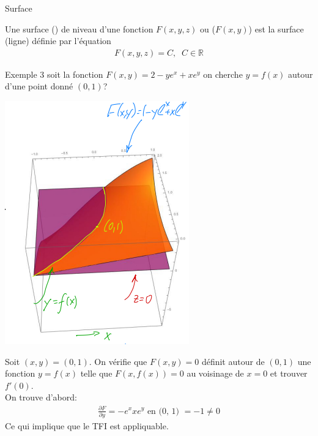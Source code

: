 \begin{parag}{Surface}
    \begin{definition}
        Une surface () de niveau d'une fonction $F\left(x, y, z\right)$ ou ($F\left(x, y\right)$) est la surface (ligne) définie par l'équation
        \begin{align*} F\left(x, y, z\right) = C , \; \; C \in \mathbb{R}\end{align*}

    \end{definition}
    
    \begin{subparag}{Exemple 3}
        soit la fonction $F\left(x, y\right) = 2-ye^x + xe^y$ on cherche $y = f\left(x\right)$ autour d'une point donné $\left(0, 1\right)$?\\
        \begin{center}
            \includegraphics[scale=0.8]{22025-04-30.png}
        \end{center}
        Soit $\left(x, y\right) = \left(0, 1\right)$. On vérifie que $F\left(x, y\right) = 0$ définit autour de $\left(0, 1\right)$ une fonction $y = f\left(x\right)$ telle que $F\left(x, f\left(x\right)\right)= 0$ au voisinage de $x = 0$ et trouver  $f'\left(0\right)$.\\
        On trouve d'abord:
        \begin{align*} \frac{\partial F}{\partial y}= -e^x xe^y \text{ en (0, 1) } = -1 \neq 0 \end{align*}
        Ce qui implique que le TFI est appliquable.\\

\end{subparag}
\end{parag}
